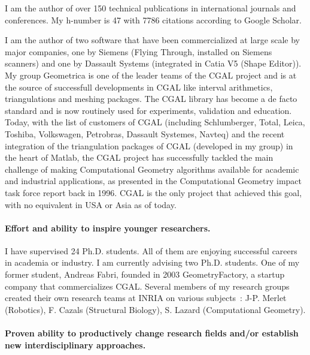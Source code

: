 
I am the author of over 150 technical publications in international journals and conferences. My h-number is 47 with 7786 citations according to Google Scholar. 

I am the author of two software that have been commercialized at large scale by major companies, one by Siemens (Flying Through, installed on Siemens scanners) and one by Dassault Systems (integrated in Catia V5 (Shape Editor)). 
My group Geometrica is one of the leader teams of the CGAL project and is at the source of successfull developments in CGAL like interval arithmetics, triangulations and meshing packages. 
The CGAL library has become a de facto standard and is now routinely used for experiments, validation and education. Today, with the list of customers of CGAL (including Schlumberger, Total, Leica, Toshiba, Volkswagen, Petrobras, Dassault Systemes, Navteq) and the recent integration of the triangulation packages of CGAL (developed in my group) in the heart of Matlab, the CGAL project has successfully tackled the main challenge of making Computational Geometry algorithms available for academic and industrial applications, as presented in the Computational Geometry impact task force report back in 1996. CGAL is the only project that achieved this goal, with no equivalent in USA or Asia as of today.




\paragraph{Effort and ability to inspire younger researchers.}
I have supervised 24 Ph.D. students. All of them are enjoying successful careers in academia or industry. I am currently advising two Ph.D. students. One of my former student, Andreas Fabri, founded in 2003 GeometryFactory, a startup company that commercializes CGAL.
Several members of my research groups created their own research teams at INRIA on various subjects~: J-P. Merlet (Robotics), F. Cazals (Structural Biology), S. Lazard (Computational Geometry).

\paragraph{Proven ability to productively change research fields and/or establish new interdisciplinary approaches.}

